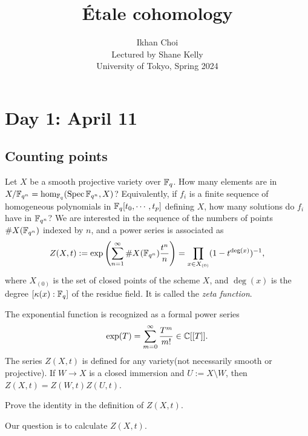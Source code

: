 \documentclass{../../../small}
\begin{document}
\title{\'Etale cohomology}
\author{Ikhan Choi\\Lectured by Shane Kelly\\University of Tokyo, Spring 2024}
\maketitle

\newpage
\section{Day 1: April 11}
\subsection{Counting points}

Let $X$ be a smooth projective variety over $\mathbb{F}_q$.
How many elements are in $X/\mathbb{F}_{q^n}=\hom_{\mathbb{F}_q}(\operatorname{Spec}\mathbb{F}_{q^n},X)$?
Equivalently, if $f_i$ is a finite sequence of homogeneous polynomials in $\mathbb{F}_q[t_0,\cdots,t_p]$ defining $X$, how many solutions do $f_i$ have in $\mathbb{F}_{q^n}$?
We are interested in the sequence of the numbers of points $\#X(\mathbb{F}_{q^n})$ indexed by $n$, and a power series is associated as
\[Z(X,t):=\exp\left(\sum_{n=1}^\infty\#X(\mathbb{F}_{q^n})\frac{t^n}n\right)=\prod_{x\in X_{(0)}}(1-t^{\deg(x)})^{-1},\]
where $X_{(0)}$ is the set of closed points of the scheme $X$, and $\deg(x)$ is the degree $[\kappa(x):\mathbb{F}_q]$ of the residue field.
It is called the \emph{zeta function}.

\begin{rmk*}
The exponential function is recognized as a formal power series
\[\exp(T)=\sum_{m=0}^\infty\frac{T^m}{m!}\in\mathbb{C}[[T]].\]
The series $Z(X,t)$ is defined for any variety(not necessarily smooth or projective).
If $W\to X$ is a closed immersion and $U:=X\setminus W$, then $Z(X,t)=Z(W,t)Z(U,t)$.
\end{rmk*}
\begin{exe*}
Prove the identity in the definition of $Z(X,t)$.
\end{exe*}

Our question is to calculate $Z(X,t)$.
\end{document}

